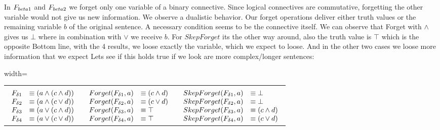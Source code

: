 In $F_{\\beta1}$ and $F_{\\beta2}$ we forget only one variable of a binary connective. Since logical connectives are commutative, forgetting the other variable would not give us new information.
We observe a dualistic behavior. Our forget operations deliver either truth values or the remaining variable $b$ of the original sentence.
A necessary condition seems to be the connective itself. We can observe that Forget with $\land$ gives us $\bot$ where in combination with $\lor$ we receive $b$.
For $SkepForget$ its the other way around, also the truth value is $\top$ which is the opposite
Bottom line, with the 4 results, we loose exactly the variable, which we expect to loose. And in the other two cases we loose more information that we expect
Lets see if this holds true if we look are more complex/longer sentences:\\
\begin{adjustbox}{width=\textwidth}
\begin{tabular}{ c  c  c }
 &  &  \\
$\begin{array}{l l}
F_{\delta1} &\equiv (a \land (c \land d))\\
F_{\delta2} &\equiv (a \land (c \lor d))\\
F_{\delta3} &\equiv (a \lor (c \land d))\\
F_{\delta4} &\equiv (a \lor (c \lor d))\\
\end{array}$ & $\begin{array}{l l}
Forget(F_{\delta1},a) &\equiv (c \land d)\\
Forget(F_{\delta2},a) &\equiv (c \lor d)\\
Forget(F_{\delta3},a) &\equiv \top\\
Forget(F_{\delta4},a) &\equiv \top\\
\end{array}$ & $\begin{array}{l l}
SkepForget(F_{\delta1},a) &\equiv \bot\\
SkepForget(F_{\delta2},a) &\equiv \bot\\
SkepForget(F_{\delta3},a) &\equiv (c \land d)\\
SkepForget(F_{\delta4},a) &\equiv (c \lor d)\\
\end{array}$\\
\end{tabular}
\end{adjustbox}\newline\newline

